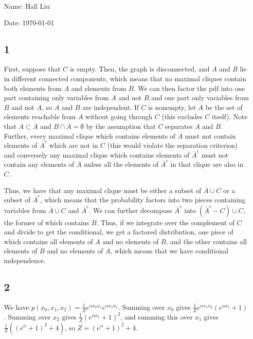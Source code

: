 \documentclass{article}
\newcommand{\conj}{\overline}
\begin{document}
Name: Hall Liu

Date: \today 
\vspace{1.5cm}
\subsection*{1}
First, suppose that $C$ is empty. Then, the graph is disconnected, and $A$ and $B$ lie in different connected components, which means that no maximal cliques contain both elements from $A$ and elements from $B$. We can then factor the pdf into one part containing only variables from $A$ and not $B$ and one part only variables from $B$ and not $A$, so $A$ and $B$ are independent. If $C$ is nonempty, let $\conj{A}$ be the set of elements reachable from $A$ without going through $C$ (this excludes $C$ itself). Note that $A\subset \conj{A}$ and $B\cap\conj{A}=\emptyset$ by the assumption that $C$ separates $A$ and $B$. Further, every maximal clique which contains elements of $\conj{A}$ must not contain elements of $\conj{A}^c$ which are not in $C$ (this would violate the separation criterion) and conversely any maximal clique which contains elements of $\conj{A}^c$ must not contain any elements of $\conj{A}$ unless all the elements of $\conj{A}^c$ in that clique are also in $C$. 

Thus, we have that any maximal clique must be either a subset of $\conj{A}\cup C$ or a subset of $\conj{A}^c$, which means that the probability factors into two pieces containing variables from $\conj{A}\cup C$ and $\conj{A}^c$. We can further decompose $\conj{A}^c$ into $(\conj{A}^c-C)\cup C$, the former of which contains $B$. Thus, if we integrate over the complement of $C$ and divide to get the conditional, we get a factored distribution, one piece of which contains all elements of $A$ and no elements of $B$, and the other contains all elements of $B$ and no elements of $A$, which means that we have conditional independence.
\subsection*{2}
We have $p(x_0,x_1,x_2)=\frac{1}{Z}e^{\alpha x_0x_1}e^{\alpha x_1x_2}$. Summing over $x_0$ gives $\frac{1}{Z}e^{\alpha x_1x_2}\left(e^{\alpha x_1}+1\right)$. Summing over $x_2$ gives $\frac{1}{Z}\left(e^{\alpha x_1}+1\right)^2$, and summing this over $x_1$ gives $\frac{1}{Z}\left(\left(e^\alpha+1\right)^2+4\right)$, so $Z=\left(e^\alpha+1\right)^2+4$.
\end{document}
